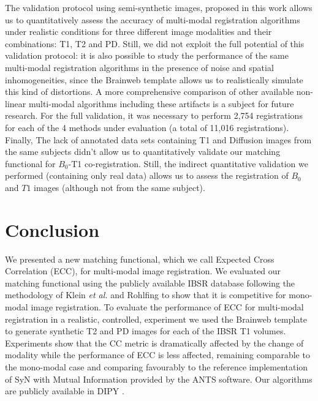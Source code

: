 The validation protocol using semi-synthetic images, proposed in this work allows us to quantitatively assess the accuracy of multi-modal registration algorithms under realistic conditions for three different image modalities and their combinations: T1, T2 and PD. Still, we did not exploit the full potential of this validation protocol: it is also possible to study the performance of the same multi-modal registration algorithms in the presence of noise and spatial inhomogeneities, since the Brainweb template allows us to realistically simulate this kind of distortions. A more comprehensive comparison of other available non-linear multi-modal algorithms including these artifacts is a subject for future research. For the full validation, it was necessary to perform 2,754 registrations for each of the 4 methods under evaluation (a total of 11,016 registrations). Finally, The lack of annotated data sets containing T1 and Diffusion images from the same subjects didn't allow us to quantitatively validate our matching functional for $B_{0}$-T1 co-registration. Still, the indirect quantitative validation we performed (containing only real data) allows us to assess the registration of $B_{0}$ and $T1$ images (although not from the same subject).

\section{Conclusion}
We presented a new matching functional, which we call Expected Cross Correlation (ECC), for multi-modal image registration. We evaluated our matching functional using the publicly available IBSR database following the methodology of Klein {\it et al.}\cite{Klein2009, Klein2010} and Rohlfing \cite{Rohlfing2012} to show that it is competitive for mono-modal image registration. To evaluate the performance of ECC for multi-modal registration in a realistic, controlled, experiment we used the Brainweb \cite{Cocosco1997, Kwan1999} template to generate synthetic T2 and PD images for each of the IBSR T1 volumes. Experiments show that the CC metric is dramatically affected by the change of modality while the performance of ECC is less affected, remaining comparable to the mono-modal case and comparing favourably to the reference implementation of SyN with Mutual Information provided by the ANTS software. Our algorithms are publicly available in DIPY \cite{Garyfallidis2014}.\\

